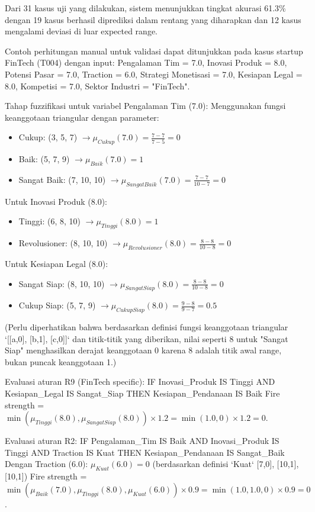 \documentclass{article}
\begin{document}
Dari 31 kasus uji yang dilakukan, sistem menunjukkan tingkat akurasi 61.3\% dengan 19 kasus berhasil diprediksi dalam rentang yang diharapkan dan 12 kasus mengalami deviasi di luar expected range.

Contoh perhitungan manual untuk validasi dapat ditunjukkan pada kasus startup FinTech (T004) dengan input: Pengalaman Tim = 7.0, Inovasi Produk = 8.0, Potensi Pasar = 7.0, Traction = 6.0, Strategi Monetisasi = 7.0, Kesiapan Legal = 8.0, Kompetisi = 7.0, Sektor Industri = "FinTech".

Tahap fuzzifikasi untuk variabel Pengalaman Tim (7.0):
Menggunakan fungsi keanggotaan triangular dengan parameter:
\begin{itemize}
    \item Cukup: (3, 5, 7) $\rightarrow \mu_{Cukup}(7.0) = \frac{7-7}{7-5} = 0$
    \item Baik: (5, 7, 9) $\rightarrow \mu_{Baik}(7.0) = 1$
    \item Sangat Baik: (7, 10, 10) $\rightarrow \mu_{SangatBaik}(7.0) = \frac{7-7}{10-7} = 0$
\end{itemize}
Untuk Inovasi Produk (8.0):
\begin{itemize}
    \item Tinggi: (6, 8, 10) $\rightarrow \mu_{Tinggi}(8.0) = 1$
    \item Revolusioner: (8, 10, 10) $\rightarrow \mu_{Revolusioner}(8.0) = \frac{8-8}{10-8} = 0$
\end{itemize}
Untuk Kesiapan Legal (8.0):
\begin{itemize}
    \item Sangat Siap: (8, 10, 10) $\rightarrow \mu_{SangatSiap}(8.0) = \frac{8-8}{10-8} = 0$
    \item Cukup Siap: (5, 7, 9) $\rightarrow \mu_{CukupSiap}(8.0) = \frac{9-8}{9-7} = 0.5$
\end{itemize}
(Perlu diperhatikan bahwa berdasarkan definisi fungsi keanggotaan triangular `[[a,0], [b,1], [c,0]]` dan titik-titik yang diberikan, nilai seperti 8 untuk "Sangat Siap" menghasilkan derajat keanggotaan 0 karena 8 adalah titik awal range, bukan puncak keanggotaan 1.)

Evaluasi aturan R9 (FinTech specific): IF Inovasi\_Produk IS Tinggi AND Kesiapan\_Legal IS Sangat\_Siap THEN Kesiapan\_Pendanaan IS Baik
Fire strength = $\min(\mu_{Tinggi}(8.0), \mu_{SangatSiap}(8.0)) \times 1.2 = \min(1.0, 0) \times 1.2 = 0$.

Evaluasi aturan R2: IF Pengalaman\_Tim IS Baik AND Inovasi\_Produk IS Tinggi AND Traction IS Kuat THEN Kesiapan\_Pendanaan IS Sangat\_Baik
Dengan Traction (6.0): $\mu_{Kuat}(6.0) = 0$ (berdasarkan definisi `Kuat` [7,0], [10,1], [10,1])
Fire strength = $\min(\mu_{Baik}(7.0), \mu_{Tinggi}(8.0), \mu_{Kuat}(6.0)) \times 0.9 = \min(1.0, 1.0, 0) \times 0.9 = 0$.
\end{document}
